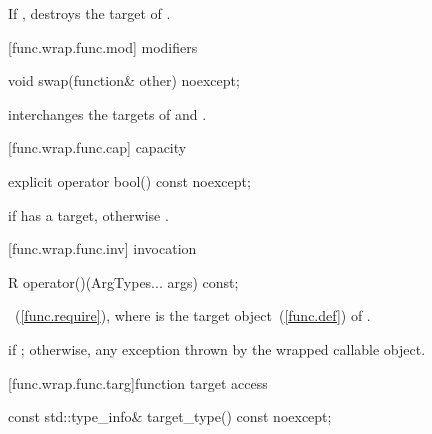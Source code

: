 \begin{itemdescr}
\pnum\effects If , destroys the target of .
\end{itemdescr}

[func.wrap.func.mod]{ modifiers}

%
%
\begin{itemdecl}
void swap(function& other) noexcept;
\end{itemdecl}

\begin{itemdescr}
\pnum\effects interchanges the targets of  and .
\end{itemdescr}

[func.wrap.func.cap]{ capacity}

%
\begin{itemdecl}
explicit operator bool() const noexcept;
\end{itemdecl}

\begin{itemdescr}
\pnum
\returns {} if  has a target, otherwise .
\end{itemdescr}

[func.wrap.func.inv]{ invocation}

%
%
%
\begin{itemdecl}
R operator()(ArgTypes... args) const;
\end{itemdecl}

\begin{itemdescr}
\pnum
\returns {}~(\ref{func.require}),
where  is the target object~(\ref{func.def}) of .

\pnum\throws
{} if ; otherwise, any
exception thrown by the wrapped callable object.
\end{itemdescr}

[func.wrap.func.targ]{function target access}

%
%
\begin{itemdecl}
const std::type_info& target_type() const noexcept;
\end{itemdecl}

